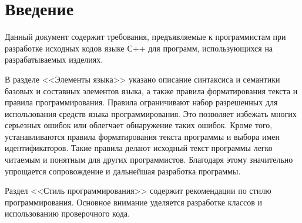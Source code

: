 \newpage
\section{Введение}

Данный документ содержит требования, предъявляемые к программистам при разработке исходных кодов языке С++ для программ, использующихся на разрабатываемых изделиях.

В разделе <<Элементы языка>> указано описание синтаксиса и семантики базовых и составных элементов языка, а также правила форматирования текста и правила программирования. Правила ограничивают набор разрешенных для использования средств языка программирования. Это позволяет избежать многих серьезных ошибок или облегчает обнаружение таких ошибок. Кроме того, устанавливаются правила форматирования текста программы и выбора имен идентификаторов. Такие правила делают исходный текст программы легко читаемым и понятным для других программистов. Благодаря этому значительно упрощается сопровождение и дальнейшая разработка программы.

Раздел <<Стиль программирования>> содержит рекомендации по стилю программирования. Основное внимание уделяется разработке классов и использованию проверочного кода.

